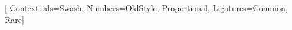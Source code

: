 \setmainfont{Adobe Garamond Pro}[
	Contextuals=Swash,
	Numbers={OldStyle, Proportional},
	Ligatures={Common, Rare}]

\newcommand{\dd}[1]{
	\addtocontents{toc}{{\protect{\hspace{\parindent}#1}\dotfill~~~\thepage\endgraf}}
	\begin{center}
		\titling\textsc{\Large{#1}}
	\end{center}
}


\setlength{\parskip}{0em}
\setlength{\parindent}{\myindent}
\setaftersubsecskip{1pt}
\setbeforesubsecskip{1pt}

